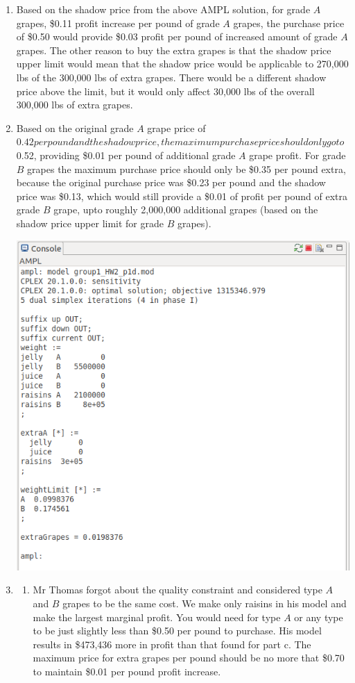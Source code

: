 \documentclass[11pt]{article}
\begin{document}
\begin{enumerate}
\begin{enumerate}
\item Based on the shadow price from the above AMPL solution, for grade $A$ grapes, \$0.11 profit increase per pound of grade $A$ grapes, the purchase price of \$0.50 would provide \$0.03 profit per pound of increased amount of grade $A$ grapes.  The other reason to buy the extra grapes is that the shadow price upper limit would mean that the shadow price would be applicable to 270,000 lbs of the 300,000 lbs of extra grapes.  There would be a different shadow price above the limit, but it would only affect 30,000 lbs of the overall 300,000 lbs of extra grapes. 
\item Based on the original grade $A$ grape price of $0.42 per pound and the shadow price, the maximum purchase price should only go to\ $0.52, providing \$0.01 per pound of additional grade $A$ grape profit.  For grade $B$ grapes the maximum purchase price should only be \$0.35 per pound extra, because the original purchase price was \$0.23 per pound and the shadow price was \$0.13, which would still provide a \$0.01 of profit per pound of extra grade $B$ grape, upto roughly 2,000,000 additional grapes (based on the shadow price upper limit for grade $B$ grapes).

\includegraphics[width=.9\textwidth]{outputp1db.png}

\item 
\begin{enumerate}
\item Mr Thomas forgot about the quality constraint and considered type $A$ and $B$ grapes to be the same cost.  We make only raisins in his model and make the largest marginal profit.  You would need for type $A$ or any type to be just slightly less than \$0.50 per pound to purchase.  His model results in \$473,436 more in profit than that found for part c.  The maximum price for extra grapes per pound should be no more that \$0.70 to maintain \$0.01 per pound profit increase. %


\end{enumerate}
\end{enumerate}
\end{enumerate}
\end{document}
